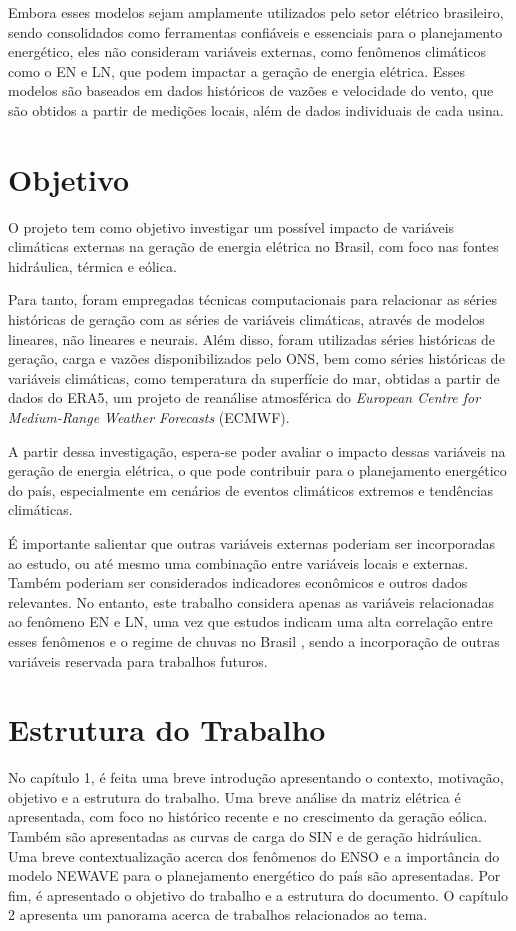 Embora esses modelos sejam amplamente utilizados pelo setor elétrico brasileiro, sendo consolidados como ferramentas
confiáveis e essenciais para o planejamento energético, eles não consideram variáveis externas, como fenômenos climáticos
como o EN e LN, que podem impactar a geração de energia elétrica. Esses modelos são baseados em dados históricos de
vazões e velocidade do vento, que são obtidos a partir de medições locais, além de dados individuais de cada usina.

\section{Objetivo}
O projeto tem como objetivo investigar um possível impacto de variáveis climáticas externas na geração 
de energia elétrica no Brasil, com foco nas fontes hidráulica, térmica e eólica. 

Para tanto, foram empregadas técnicas computacionais para relacionar as séries históricas de geração com as séries de variáveis 
climáticas, através de modelos lineares, não lineares e neurais. Além disso, foram utilizadas séries históricas de geração, 
carga e vazões disponibilizados pelo ONS, bem como séries históricas de variáveis climáticas, como temperatura 
da superfície do mar, obtidas a partir de dados do ERA5, um projeto de reanálise atmosférica do \textit{European Centre for Medium-Range Weather Forecasts} (ECMWF).

A partir dessa investigação, espera-se poder avaliar o impacto dessas variáveis na geração de energia elétrica,
o que pode contribuir para o planejamento energético do país, especialmente em cenários de eventos climáticos extremos e
tendências climáticas.

É importante salientar que outras variáveis externas poderiam ser incorporadas ao estudo, ou até mesmo uma combinação entre
 variáveis locais e externas. Também poderiam ser considerados indicadores econômicos e outros dados relevantes. 
No entanto, este trabalho considera apenas as variáveis relacionadas ao fenômeno EN e LN, uma vez que estudos indicam
uma alta correlação entre esses fenômenos e o regime de chuvas no Brasil \cite{de2012influencia, Andreoli2016}, sendo a 
incorporação de outras variáveis reservada para trabalhos futuros.

\section{Estrutura do Trabalho}
No capítulo 1, é feita uma breve introdução apresentando o contexto, motivação, objetivo e a estrutura do trabalho. Uma
breve análise da matriz elétrica é apresentada, com foco no histórico recente e no crescimento da geração eólica. Também
são apresentadas as curvas de carga do SIN e de geração hidráulica. Uma breve contextualização acerca dos fenômenos do
ENSO e a importância do modelo NEWAVE para o planejamento energético do país são apresentadas. Por fim, é apresentado
o objetivo do trabalho e a estrutura do documento. O capítulo 2 apresenta um panorama acerca de trabalhos relacionados ao tema.

